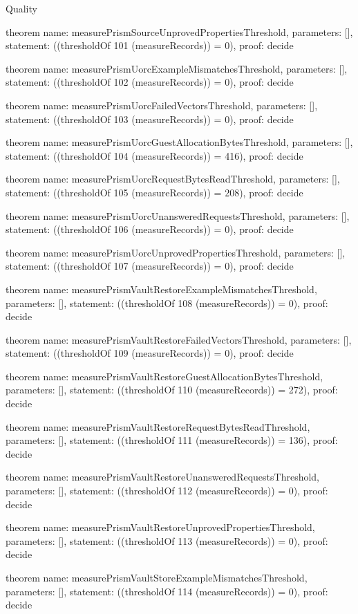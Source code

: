 \begin{lexlean}{Quality}
\begin{semanticmodule}
theorem{
  name: measurePrismSourceUnprovedPropertiesThreshold,
  parameters: [],
  statement: ((thresholdOf 101 (measureRecords)) = 0),
  proof: decide{}
}

theorem{
  name: measurePrismUorcExampleMismatchesThreshold,
  parameters: [],
  statement: ((thresholdOf 102 (measureRecords)) = 0),
  proof: decide{}
}

theorem{
  name: measurePrismUorcFailedVectorsThreshold,
  parameters: [],
  statement: ((thresholdOf 103 (measureRecords)) = 0),
  proof: decide{}
}

theorem{
  name: measurePrismUorcGuestAllocationBytesThreshold,
  parameters: [],
  statement: ((thresholdOf 104 (measureRecords)) = 416),
  proof: decide{}
}

theorem{
  name: measurePrismUorcRequestBytesReadThreshold,
  parameters: [],
  statement: ((thresholdOf 105 (measureRecords)) = 208),
  proof: decide{}
}

theorem{
  name: measurePrismUorcUnansweredRequestsThreshold,
  parameters: [],
  statement: ((thresholdOf 106 (measureRecords)) = 0),
  proof: decide{}
}

theorem{
  name: measurePrismUorcUnprovedPropertiesThreshold,
  parameters: [],
  statement: ((thresholdOf 107 (measureRecords)) = 0),
  proof: decide{}
}

theorem{
  name: measurePrismVaultRestoreExampleMismatchesThreshold,
  parameters: [],
  statement: ((thresholdOf 108 (measureRecords)) = 0),
  proof: decide{}
}

theorem{
  name: measurePrismVaultRestoreFailedVectorsThreshold,
  parameters: [],
  statement: ((thresholdOf 109 (measureRecords)) = 0),
  proof: decide{}
}

theorem{
  name: measurePrismVaultRestoreGuestAllocationBytesThreshold,
  parameters: [],
  statement: ((thresholdOf 110 (measureRecords)) = 272),
  proof: decide{}
}

theorem{
  name: measurePrismVaultRestoreRequestBytesReadThreshold,
  parameters: [],
  statement: ((thresholdOf 111 (measureRecords)) = 136),
  proof: decide{}
}

theorem{
  name: measurePrismVaultRestoreUnansweredRequestsThreshold,
  parameters: [],
  statement: ((thresholdOf 112 (measureRecords)) = 0),
  proof: decide{}
}

theorem{
  name: measurePrismVaultRestoreUnprovedPropertiesThreshold,
  parameters: [],
  statement: ((thresholdOf 113 (measureRecords)) = 0),
  proof: decide{}
}

theorem{
  name: measurePrismVaultStoreExampleMismatchesThreshold,
  parameters: [],
  statement: ((thresholdOf 114 (measureRecords)) = 0),
  proof: decide{}
}


\end{semanticmodule}
\end{lexlean}
